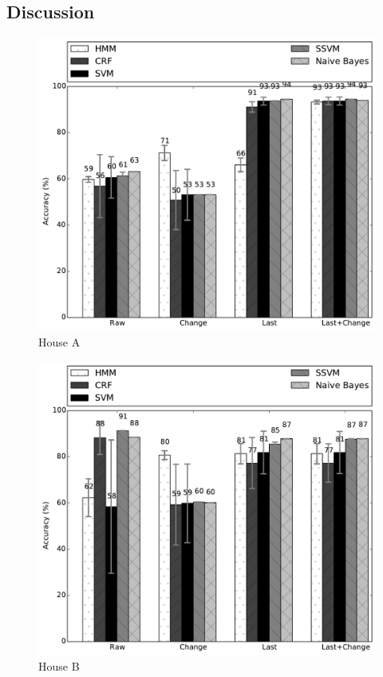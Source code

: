 \subsection{Discussion}
\begin{figure}[t!]
\begin{center}
\includegraphics[width=5in]{../../src/reports/A.pdf}
\end{center}
\vspace{-0.5cm}
\caption{House A}
\label{fig:house_a}
\vspace{-0.5cm}
\end{figure}

\begin{figure}[t!]
\begin{center}
\includegraphics[width=5in]{../../src/reports/B.pdf}
\end{center}
\vspace{-0.5cm}
\caption{House B}
\label{fig:house_b}
\vspace{-0.5cm}
\end{figure}

